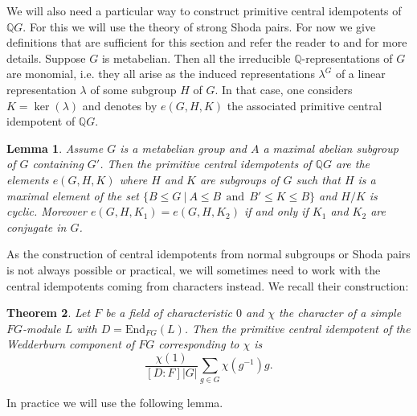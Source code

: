 \documentclass[a4paper,10pt]{amsart}
\newtheorem{lemma}{Lemma}[section]
\newtheorem{theorem}[lemma]{Theorem}
\theoremstyle{definition}
\theoremstyle{remark}
\newcommand{\Q}{{\mathbb Q}}
\begin{document}
We will also need a particular way to construct primitive central idempotents of $\mathbb{Q}G$. For this we will use the theory of strong Shoda pairs. For now we give definitions that are sufficient for this section and refer the reader to  and \cite[Chapter 3]{GRG1} for more details. Suppose $G$ is metabelian. Then all the irreducible $\Q$-representations of $G$ are monomial, i.e. they all arise as the induced representations $\lambda^G$ of a linear representation $\lambda$ of some subgroup $H$ of $G$. In that case, one considers $K = \ker(\lambda)$ and denotes by $e(G,H,K)$ the associated primitive central idempotent of $\mathbb{Q}G$. 

\begin{lemma}\label{lem:IdempotForMetabelian}\cite[Theorem 3.5.12 and Exercise 3.4.4]{GRG1}
Assume $G$ is a metabelian group and $A$ a maximal abelian subgroup of $G$ containing $G'$. Then the primitive central idempotents of $\mathbb{Q}G$ are the elements $e(G,H,K)$ where $H$ and $K$ are subgroups of $G$ such that $H$ is a maximal element of the set $\{B \leq G \ | \ A\leq B \ \ \text{and} \ \ B' \leq K \leq B \}$ and $H/K$ is cyclic. Moreover $e(G,H,K_1) = e(G,H,K_2)$ if and only if $K_1$ and $K_2$ are conjugate in $G$. 
\end{lemma}

As the construction of central idempotents from normal subgroups or Shoda pairs is not always possible or practical, we will sometimes need to work with the central idempotents coming from characters instead. We recall their construction:

\begin{theorem}\label{th:IdempotentsFromCharacters}\cite[Theorem 2.1.6]{LuxPahlings}
Let $F$ be a field of characteristic $0$ and $\chi$ the character of a simple $FG$-module $L$ with $D = \text{End}_{FG}(L)$. Then the primitive central idempotent of the Wedderburn component of $FG$ corresponding to $\chi$ is
\[\frac{\chi(1)}{[D:F]|G|}\sum_{g \in G} \chi(g^{-1})g. \]
\end{theorem}

In practice we will use the following lemma.
\end{document}
